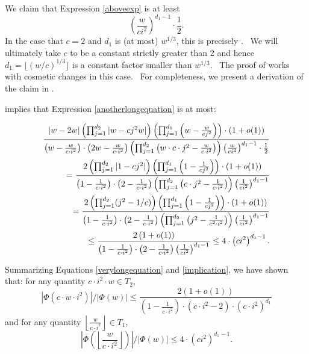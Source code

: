 We claim that Expression \eqref{aboveexp} is at least
\begin{equation}
\left( \frac{w}{ci^{2}}\right) ^{d_{1}-1}\cdot \frac{1}{2}.
\label{provedintheappendix}
\end{equation}
In the case that $c=2$ and $d_{1}$ is (at most) $w^{1/3}$, this is precisely
\cite[Claim 4]{zhandry}. \ We will ultimately take $c$ to be a constant
strictly greater than 2 and hence $d_{1}=\lfloor \left( w/c\right)
^{1/3}\rfloor $ is a constant factor smaller than $w^{1/3}$. \ The proof of
\cite[Claim 4]{zhandry} works with cosmetic changes in this case. \ For
completeness, we present a derivation of the claim in .

 implies that Expression \eqref{anotherlongequation} is
at most:

\begin{align}
\frac{|w-2w| \left(\prod_{j=1}^{d_2} |w - cj^2 w| \right)
\left(\prod_{j=1}^{d_1} \left( w - \frac{w}{cj^2}\right)\right) \cdot
\left(1+o(1)\right)}{ \left(w- \frac{w}{c \cdot i^2}\right) \cdot \left(2w -
\frac{w}{c \cdot i^2} \right) \left(\prod_{j=1}^{d_2} \left(w \cdot c \cdot
j^2 - \frac{w}{c \cdot i^2}\right)\right) \left(\frac{w}{ci^2}
\right)^{d_1-1} \cdot \frac{1}{2}}  \notag \\
= \frac{2 \left(\prod_{j=1}^{d_2} |1 - cj^2| \right) \left(\prod_{j=1}^{d_1}
\left(1 - \frac{1}{cj^2}\right)\right) \cdot \left(1+o(1)\right)}{ \left(1-
\frac{1}{c \cdot i^2}\right) \cdot \left(2 - \frac{1}{c \cdot i^2} \right)
\left(\prod_{j=1}^{d_2} \left(c \cdot j^2 - \frac{1}{c \cdot i^2}
\right)\right) \left(\frac{1}{ci^2}\right)^{d_1-1}}  \notag \\
= \frac{2 \left(\prod_{j=1}^{d_2} (j^2-1/c) \right) \left(\prod_{j=1}^{d_1}
\left(1 - \frac{1}{cj^2}\right)\right) \cdot \left(1+o(1)\right)}{ \left(1-
\frac{1}{c \cdot i^2}\right) \cdot \left(2 - \frac{1}{c \cdot i^2} \right)
\left(\prod_{j=1}^{d_2} \left(j^2 - \frac{1}{c^2 \cdot i^2}\right)\right)
\left(\frac{1}{ci^2}\right)^{d_1-1}}  \notag \\
\leq \frac{2 \left(1+o(1)\right)}{ \left(1- \frac{1}{c \cdot i^2}\right)
\cdot \left(2 - \frac{1}{c \cdot i^2} \right) \left(\frac{1}{ci^2}
\right)^{d_1-1}} \leq 4 \cdot \left(ci^2\right)^{d_1-1}.  \label{implication}
\end{align}

Summarizing Equations \eqref{verylongequation} and \eqref{implication}, we have shown
that: for any quantity $c \cdot i^2 \cdot w \in T_2$,
\begin{equation}  \label{keyeq1}
\left|\Phi(c \cdot w \cdot i^2)\right|/\left|\Phi(w)\right| \leq \frac{2
\left(1+o(1)\right)}{\left(1-\frac{1}{c \cdot i^2}\right) \cdot (c \cdot i^2
- 2) \cdot (c\cdot i^2)^{d_1}}
\end{equation}
and for any quantity $\left\lfloor \frac{w}{c \cdot i^2} \right\rfloor \in T_1$,
\begin{equation}  \label{keyeq2}
\left|\Phi\left( \left\lfloor \frac{w}{c \cdot i^2}\right\rfloor\right)\right|/\left|\Phi(w)
\right| \leq 4\cdot \left(ci^2\right)^{d_1-1}.
\end{equation}


